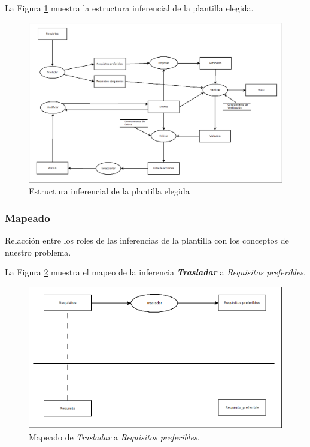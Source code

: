 La Figura \ref{fig:EstructuraInferencial} muestra la estructura inferencial de la plantilla elegida.
\begin{figure}[H]
  \centering
  \includegraphics[scale=0.30]{imaxes/PlantillaInferencial.png}
  \caption{\label{fig:EstructuraInferencial}Estructura inferencial de la plantilla elegida}
\end{figure}

\subsubsection{Mapeado}

Relacción entre los roles de las inferencias de la plantilla con los conceptos de nuestro problema.

La Figura \ref{fig:TrasladarPreferibles} muestra el mapeo de la inferencia \textbf{\textit{Trasladar}} a \textit{Requisitos preferibles}.

\begin{figure}[H]
  \centering
  \includegraphics[scale=0.35]{imaxes/TrasladarPreferibles.png}
  \caption{\label{fig:TrasladarPreferibles}Mapeado de \textit{Trasladar} a \textit{Requisitos preferibles}.}
\end{figure}

